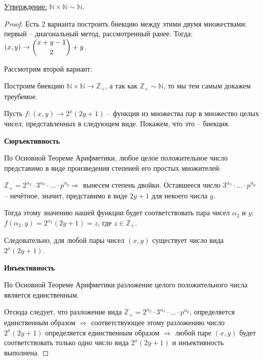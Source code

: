 \documentclass[a4paper, 12pt]{article}
\newcommand{\statement}{\underline{Утверждение:} }
\newcommand{\Z}{\mathbb{Z}}
\newcommand{\N}{\mathbb{N}}
\begin{document}
\statement $\N \times \N \sim \N$.
\begin{proof}

    Есть 2 варианта построить биекцию между этими двумя множествами: первый -- диагональный метод, рассмотренный ранее. Тогда:
    $(x, y) \to \dbinom {x + y - 1}2 + y$.
    
    Рассмотрим второй вариант:
    
    Построим биекцию $\N \times \N \to \Z_{+}$, а так как $\Z_{+} \sim \N$, то мы тем самым докажем треубемое.
    
    Пусть $f : (x, y) \to 2^x(2y + 1)$ -- функция из множества пар в множество целых чисел, представленных в следующем виде. Покажем, что это -- биекция.
    
    \textbf{Сюръективность}
    
        По Основной Теореме Арифметики, любое целое положительное число представимо в виде произведения степеней его простых множителей:
        
        $\Z_{+} = 2^{\alpha_2} \cdot 3^{\alpha_3} \cdot \ldots \cdot p^{\alpha_p} \Rightarrow$ вынесем степень двойки. Оставшееся число $3^{\alpha_3} \cdot \ldots \cdot p^{\alpha_p}$ -- нечётное, значит, представимо в виде $2y + 1$ для некоего числа $y$.
        
        Тогда этому значению нашей функции будет соответствовать пара чисел $\alpha_{2}$ и $y$: $f(\alpha_{2}, y) = 2^{\alpha_{2}}(2y + 1) = z$, где $z \in \Z_{+}$. 
        
        Следовательно, для любой пары чисел $(x, y)$ существует число вида $2^x(2y + 1)$.
        
    \textbf{Инъективность}
    
        По Основной Теореме Арифметики разложение целого положительного числа является единственным.
        
        Отсюда следует, что разложение вида  $\Z_{+} = 2^{\alpha_2} \cdot 3^{\alpha_3} \cdot \ldots \cdot p^{\alpha_p}$, определяется единственным образом $\Rightarrow$ соответствующее этому разложению число $2^x(2y + 1)$ определяется единственным образом $\Rightarrow$ любой паре $(x, y)$ будет соответствовать только одно число вида $2^x(2y + 1)$ и инъективность выполнена.
\end{proof}
\end{document}
